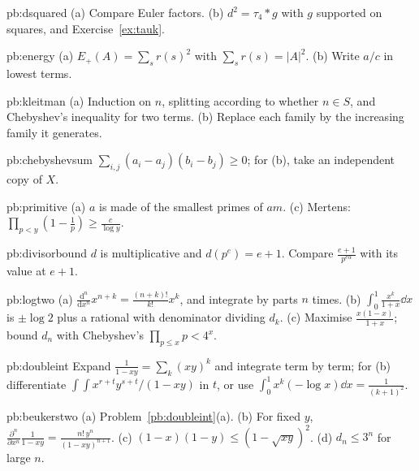 \begin{hint}{pb:dsquared}
(a) Compare Euler factors. (b) $d^2=\tau_4*g$ with $g$ supported on squares, and Exercise~\ref{ex:tauk}.
\end{hint}

\begin{hint}{pb:energy}
(a) $E_+(A)=\sum_sr(s)^2$ with $\sum_sr(s)=|A|^2$. (b) Write $a/c$ in lowest terms.
\end{hint}

\begin{hint}{pb:kleitman}
(a) Induction on $n$, splitting according to whether $n\in S$, and Chebyshev's inequality for two terms. (b) Replace each family by
the increasing family it generates.
\end{hint}

\begin{hint}{pb:chebyshevsum}
$\sum_{i,j}(a_i-a_j)(b_i-b_j)\ge0$; for (b), take an independent copy of $X$.
\end{hint}

\begin{hint}{pb:primitive}
(a) $a$ is made of the smallest primes of $am$. (c) Mertens: $\prod_{p<y}(1-\frac1p)\ge\frac c{\log y}$.
\end{hint}

\begin{hint}{pb:divisorbound}
$d$ is multiplicative and $d(p^e)=e+1$. Compare $\frac{e+1}{p^{e\alpha}}$ with its value at $e+1$.
\end{hint}

\begin{hint}{pb:logtwo}
(a) $\frac{\mathrm d^n}{\mathrm dx^n}x^{n+k}=\frac{(n+k)!}{k!}x^k$, and integrate by parts $n$ times. (b) $\int_0^1\frac{x^k}{1+x}\dd x$ is $\pm\log2$ plus a rational with
denominator dividing $d_k$. (c) Maximise $\frac{x(1-x)}{1+x}$; bound $d_n$ with Chebyshev's $\prod_{p\le x}p<4^x$.
\end{hint}

\begin{hint}{pb:doubleint}
Expand $\frac1{1-xy}=\sum_k(xy)^k$ and integrate term by term; for (b) differentiate $\int\!\!\int x^{r+t}y^{s+t}/(1-xy)$ in $t$, or use
$\int_0^1x^k(-\log x)\dd x=\frac1{(k+1)^2}$.
\end{hint}

\begin{hint}{pb:beukerstwo}
(a) Problem~\ref{pb:doubleint}(a). (b) For fixed $y$, $\frac{\partial^n}{\partial x^n}\frac1{1-xy}=\frac{n!\,y^n}{(1-xy)^{n+1}}$. (c) $(1-x)(1-y)\le(1-\sqrt{xy})^2$.
(d) $d_n\le3^n$ for large $n$.
\end{hint}


